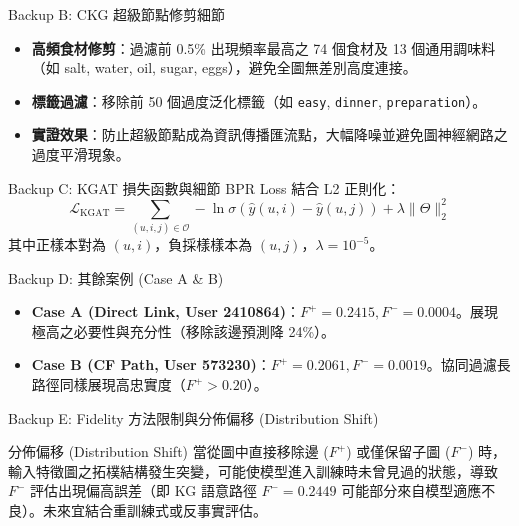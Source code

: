 \documentclass[aspectratio=169, 10pt]{beamer}
\begin{document}
\begin{frame}{Backup B: CKG 超級節點修剪細節}
  \begin{itemize}
    \item \textbf{高頻食材修剪}：過濾前 0.5\% 出現頻率最高之 74 個食材及 13 個通用調味料（如 salt, water, oil, sugar, eggs），避免全圖無差別高度連接。
    \item \textbf{標籤過濾}：移除前 50 個過度泛化標籤（如 \texttt{easy}, \texttt{dinner}, \texttt{preparation}）。
    \item \textbf{實證效果}：防止超級節點成為資訊傳播匯流點，大幅降噪並避免圖神經網路之過度平滑現象。
  \end{itemize}
\end{frame}

\begin{frame}{Backup C: KGAT 損失函數與細節}
  BPR Loss 結合 L2 正則化：
  \[
  \mathcal{L}_{\text{KGAT}} = \sum_{(u, i, j) \in \mathcal{O}} -\ln \sigma \left( \hat{y}(u,i) - \hat{y}(u,j) \right) + \lambda \|\Theta\|_2^2
  \]
  其中正樣本對為 $(u,i)$，負採樣樣本為 $(u,j)$，$\lambda = 10^{-5}$。
\end{frame}

\begin{frame}{Backup D: 其餘案例 (Case A \& B)}
  \begin{itemize}
    \item \textbf{Case A (Direct Link, User 2410864)}：$F^+ = 0.2415, F^- = 0.0004$。展現極高之必要性與充分性（移除該邊預測降 24\%）。
    \item \textbf{Case B (CF Path, User 573230)}：$F^+ = 0.2061, F^- = 0.0019$。協同過濾長路徑同樣展現高忠實度（$F^+ > 0.20$）。
  \end{itemize}
\end{frame}

\begin{frame}{Backup E: Fidelity 方法限制與分佈偏移 (Distribution Shift)}
  \begin{block}{分佈偏移 (Distribution Shift)}
    當從圖中直接移除邊 ($F^+$) 或僅保留子圖 ($F^-$) 時，輸入特徵圖之拓樸結構發生突變，可能使模型進入訓練時未曾見過的狀態，導致 $F^-$ 評估出現偏高誤差（即 KG 語意路徑 $F^- = 0.2449$ 可能部分來自模型適應不良）。未來宜結合重訓練式或反事實評估。
  \end{block}
\end{frame}
\end{document}
